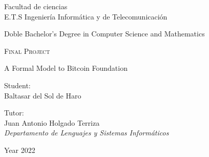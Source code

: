\documentclass[../Main.tex]{subfiles}
\begin{document}
%
%
%
%
%
%
%
%
%


\begin{titlepage}
	\AddToShipoutPicture*{\BackgroundPic}

	\begin{addmargin}[2.575cm]{0cm}
		\begin{flushleft}
			\Large  
			\hfill\vfil

			\large{\textsf{Facultad de ciencias \\ E.T.S Ingeniería Informática y de Telecomunicación}}
			\vfill

			{\large\textsc Doble Bachelor's Degree in Computer Science and Mathematics} \vfill


			{\large\textsc{Final Project}}

			\begin{flushleft}
				\Huge
				A Formal Model to Bitcoin Foundation
			\end{flushleft}

			\vfill\vfill\vfill\vfill

			\textsf{\normalsize{Student:}}\\
			{\normalsize\textrm{Baltasar del Sol de Haro}} 
			\bigskip

			\textsf{\normalsize{Tutor:}}\\
			{\normalsize\rmfamily Juan Antonio Holgado Terriza \\ \emph{Departamento de Lenguajes y Sistemas Informáticos}}

			\bigskip
			\textsf{\normalsize{Year 2022}}
		\end{flushleft}  
	\end{addmargin}       

\end{titlepage}  
\end{document}

